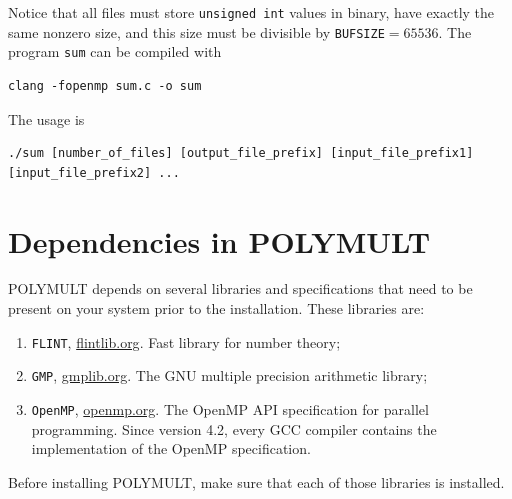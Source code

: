 \documentclass[a4paper,10pt]{article}
\newcommand{\code}{\lstinline}
\begin{document}
\begin{itemize}
\begin{itemize}
Notice that all files must store \code{unsigned int} values in binary, have exactly the same nonzero size, and this size must be divisible by \code{BUFSIZE}$=65536$. The program \code{sum} can be compiled with

\begin{verbatim}
clang -fopenmp sum.c -o sum
\end{verbatim}

The usage is

\begin{verbatim}
./sum [number_of_files] [output_file_prefix] [input_file_prefix1] [input_file_prefix2] ...
\end{verbatim}
\end{itemize}
\end{itemize}

%
%





\section{Dependencies in POLYMULT} \label{sec:dependencies}

POLYMULT depends on several libraries and specifications that need to be present on your system prior to the installation. These libraries are:

\begin{enumerate}
\item \code{FLINT}, \url{flintlib.org}. Fast library for number theory;
\item \code{GMP}, \url{gmplib.org}. The GNU multiple precision arithmetic library;
\item \code{OpenMP}, \url{openmp.org}. The OpenMP API specification for parallel programming. Since version 4.2, every GCC compiler contains the implementation of the OpenMP specification.
\end{enumerate}

Before installing POLYMULT, make sure that each of those libraries is installed.
\end{document}
